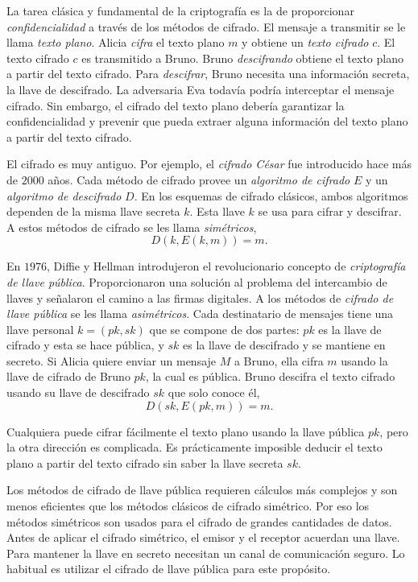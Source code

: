 \documentclass[12pt]{book}
\theoremstyle{definition}
\begin{document}
La tarea clásica y fundamental de la criptografía es la de proporcionar \textit{confidencialidad} a través de los métodos de cifrado. El mensaje a transmitir se le llama \textit{texto plano}. Alicia \textit{cifra} el texto plano $m$ y obtiene un \textit{texto cifrado} $c$. El texto cifrado $c$ es transmitido a Bruno. Bruno \textit{descifrando} obtiene el texto plano a partir del texto cifrado. Para \textit{descifrar}, Bruno necesita una información secreta, la llave de descifrado. La adversaria Eva todavía podría interceptar el mensaje cifrado. Sin embargo, el cifrado del texto plano debería garantizar la confidencialidad y prevenir que pueda extraer alguna información del texto plano a partir del texto cifrado.

El cifrado es muy antiguo. Por ejemplo, el \textit{cifrado César} fue introducido hace más de $2000$ años. Cada método de cifrado provee un \textit{algoritmo de cifrado} $E$ y un \textit{algoritmo de descifrado} $D$. En los esquemas de cifrado clásicos, ambos algoritmos dependen de la misma llave secreta $k$. Esta llave $k$ se usa para cifrar y descifrar. A estos métodos de cifrado se les llama \textit{simétricos},
$$D(k,E(k,m))=m.$$

En $1976$, Diffie y Hellman introdujeron el revolucionario concepto de \textit{criptografía de llave pública}. Proporcionaron una solución al problema del intercambio de llaves y señalaron el camino a las firmas digitales. A los métodos de \textit{cifrado de llave pública} se les llama \textit{asimétricos}. Cada destinatario de mensajes tiene una llave personal $k = (pk,sk)$ que se compone de dos partes: $pk$ es la llave de cifrado y esta se hace pública, y $sk$ es la llave de descifrado y se mantiene en secreto. Si Alicia quiere enviar un mensaje $M$ a Bruno, ella cifra $m$ usando la llave de cifrado de Bruno $pk$, la cual es pública. Bruno descifra el texto cifrado usando su llave de descifrado $sk$ que solo conoce él,
$$D(sk,E(pk,m))=m.$$

Cualquiera puede cifrar fácilmente el texto plano usando la llave pública $pk$, pero la otra dirección es complicada. Es prácticamente imposible deducir el texto plano a partir del texto cifrado sin saber la llave secreta $sk$.

Los métodos de cifrado de llave pública requieren cálculos más complejos y son menos eficientes que los métodos clásicos de cifrado simétrico. Por eso los métodos simétricos son usados para el cifrado de grandes cantidades de datos. Antes de aplicar el cifrado simétrico, el emisor y el receptor acuerdan una llave. Para mantener la llave en secreto necesitan un canal de comunicación seguro. Lo habitual es utilizar el cifrado de llave pública para este propósito.
\end{document}

